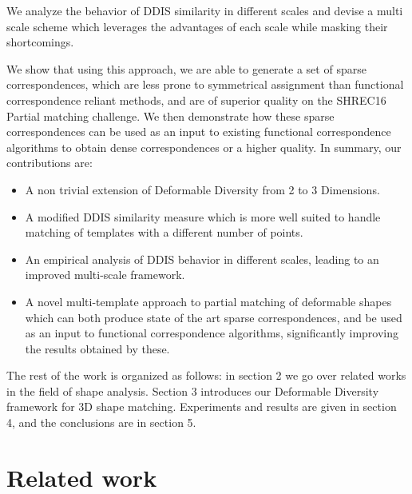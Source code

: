 \documentclass[10pt,twocolumn,letterpaper]{article}
\begin{document}
We analyze the behavior of DDIS similarity in different scales and devise a multi scale scheme which leverages the advantages of each scale while masking their shortcomings.

We show that using this approach, we are able to generate a set of sparse correspondences, which are less prone to symmetrical assignment than functional correspondence reliant methods, and are of superior quality on the SHREC16 Partial matching challenge\cite{cosmo2016shrec}. We then demonstrate how these sparse correspondences can be used as an input to existing functional correspondence algorithms to obtain dense correspondences or a higher quality.
In summary, our contributions are:
\begin{itemize}
	\item A non trivial extension of Deformable Diversity from 2 to 3 Dimensions.
	\item A modified DDIS similarity measure which is more well suited to handle matching of templates with a different number of points.
	\item An empirical analysis of DDIS behavior in different scales, leading to an improved multi-scale framework.
	\item A novel multi-template approach to partial matching of deformable shapes which can both produce state of the art sparse correspondences, and be used as an input to functional correspondence algorithms, significantly improving the results obtained by these.
\end{itemize}

The rest of the work is organized as follows: in section 2 we go over related works in the field of shape analysis. Section 3 introduces our Deformable Diversity framework for 3D shape matching. Experiments and results are given in section 4, and the conclusions are in section 5.


\section{Related work}\label{chap:related work}
\end{document}
